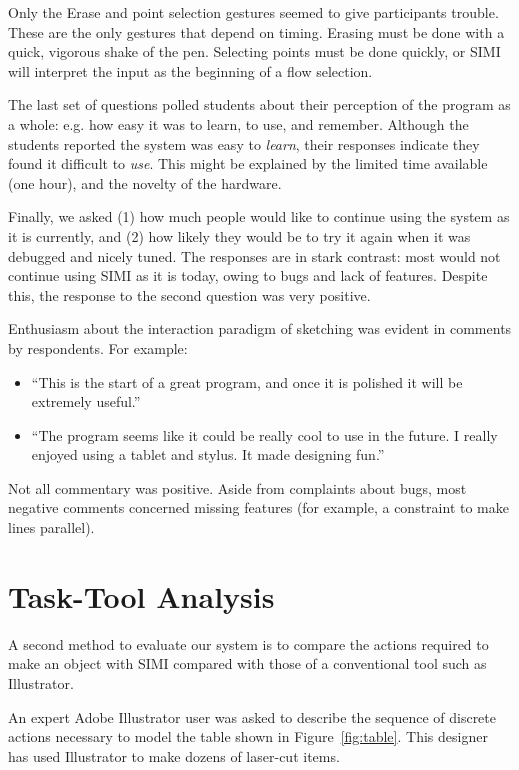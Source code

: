 Only the Erase and point selection gestures seemed to give
participants trouble. These are the only gestures that depend on
timing. Erasing must be done with a quick, vigorous shake of the
pen. Selecting points must be done quickly, or SIMI will interpret the
input as the beginning of a flow selection.

The last set of questions polled students about their perception of
the program as a whole: e.g. how easy it was to learn, to use, and
remember. Although the students reported the system was easy to
\textit{learn}, their responses indicate they found it difficult to
\textit{use}. This might be explained by the limited time available
(one hour), and the novelty of the hardware.

Finally, we asked (1) how much people would like to continue using the
system as it is currently, and (2) how likely they would be to try it
again when it was debugged and nicely tuned. The responses are in
stark contrast: most would not continue using SIMI as it is today,
owing to bugs and lack of features. Despite this, the response to the
second question was very positive.

Enthusiasm about the interaction paradigm of sketching was evident in
comments by respondents. For example:

\begin{itemize}
\item ``This is the start of a great program, and once it is polished it
  will be extremely useful.''
\item ``The program seems like it could be really cool to use in the
  future. I really enjoyed using a tablet and stylus. It made
  designing fun.''
\end{itemize}

Not all commentary was positive. Aside from complaints about bugs,
most negative comments concerned missing features (for example, a
constraint to make lines parallel).

\section{Task-Tool Analysis}

A second method to evaluate our system is to compare the actions
required to make an object with SIMI compared with those of a
conventional tool such as Illustrator.

An expert Adobe Illustrator user was asked to describe the sequence of
discrete actions necessary to model the table shown in
Figure~\ref{fig:table}. This designer has used Illustrator to make
dozens of laser-cut items.

